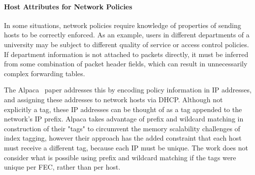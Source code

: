 \paragraph{Host Attributes for Network Policies}
In some situations, network policies require knowledge of properties of sending hosts to be correctly enforced. As an example, users in different departments of a university may be subject to different quality of service or access control policies. If department information is not attached to packets directly, it must be inferred from some combination of packet header fields, which can result in unnecessarily complex forwarding tables. 

The Alpaca~\cite{alpaca} paper addresses this by encoding policy information in IP addresses, and assigning these addresses to network hosts via DHCP. Although not explicitly a tag, these IP addresses can be thought of as a tag appended to the network's IP prefix. Alpaca takes advantage of prefix and wildcard matching in construction of their "tags" to circumvent the memory scalability challenges of index tagging, however their approach has the added constraint that each host must receive a different tag, because each IP must be unique. The work does not consider what is possible using prefix and wildcard matching if the tags were unique per FEC, rather than per host.


